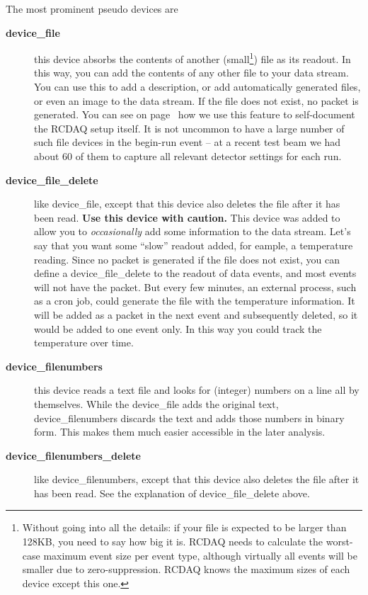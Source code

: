 \documentclass{article}[11pt]
\begin{document}
The most prominent pseudo devices are 
\begin{description}

\item[\bf device\_file] this device absorbs the contents of another
  (small\footnote{Without going into all the details: if your file is
  expected to be larger than 128KB, you need to say how big it
  is. RCDAQ needs to calculate the worst-case maximum event size per
  event type, although virtually all events will be smaller due to
  zero-suppression. RCDAQ knows the maximum sizes of each device
  except this one.}) file as its readout. In this way, you can add the
  contents of any other file to your data stream. You can use this to
  add a description, or add automatically generated files, or even an
  image to the data stream. If the file does not exist, no packet is
  generated. You can see on page~\pageref{packet900} how we use this
  feature to self-document the RCDAQ setup itself. It is not uncommon
  to have a large number of such file devices in the begin-run event
  -- at a recent test beam we had about 60 of them to capture all
  relevant detector settings for each run.

\item[\bf device\_file\_delete] \label{delete}like device\_file,
  except that this device also deletes the file after it has been
  read. {\bf Use this device with caution.} This device was added to
  allow you to \emph{occasionally} add some information to the data
  stream. Let's say that you want some ``slow'' readout added, for
  eample, a temperature reading.  Since no packet is generated if the
  file does not exist, you can define a device\_file\_delete to the
  readout of data events, and most events will not have the
  packet. But every few minutes, an external process, such as a cron
  job, could generate the file with the temperature information. It
  will be added as a packet in the next event and subsequently
  deleted, so it would be added to one event only. In this way you
  could track the temperature over time.


\item[\bf device\_filenumbers] this device reads a text file and looks for
  (integer) numbers on a line all by themselves. While the
  device\_file adds the original text, device\_filenumbers discards
  the text and adds those numbers in binary form.  This makes them
  much easier accessible in the later analysis.

\item[\bf device\_filenumbers\_delete] like device\_filenumbers, except
  that this device also deletes the file after it has been read. See
  the explanation of device\_file\_delete above. 


\end{description}
\end{document}
